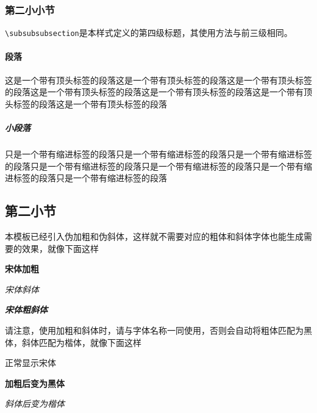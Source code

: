 \documentclass[supercite]{HustGraduTrans}
\begin{document}
    \subsubsection{第二小小节}
    \label{subsubsubsec:subsubsubsec}
    
    \verb|\subsubsubsection|是本样式定义的第四级标题，其使用方法与前三级相同。
    
    \paragraph{段落}\label{para:para}这是一个带有顶头标签的段落这是一个带有顶头标签的段落这是一个带有顶头标签的段落这是一个带有顶头标签的段落这是一个带有顶头标签的段落这是一个带有顶头标签的段落这是一个带有顶头标签的段落
    \subparagraph{小段落}\label{subpara:subpara}只是一个带有缩进标签的段落只是一个带有缩进标签的段落只是一个带有缩进标签的段落只是一个带有缩进标签的段落只是一个带有缩进标签的段落只是一个带有缩进标签的段落只是一个带有缩进标签的段落
    \subsection{第二小节}
    本模板已经引入伪加粗和伪斜体，这样就不需要对应的粗体和斜体字体也能生成需要的效果，就像下面这样
    
    {\songti \bfseries 宋体加粗}
    
    {\songti \itshape 宋体斜体}
    
    {\songti \bfseries \itshape 宋体粗斜体}
    
    请注意，使用加粗和斜体时，请与字体名称一同使用，否则会自动将粗体匹配为黑体，斜体匹配为楷体，就像下面这样
    
    {正常显示宋体}
    
    {\bfseries 加粗后变为黑体}
    
    {\itshape 斜体后变为楷体}
    
\end{document}
